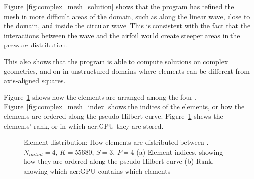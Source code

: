 Figure~\ref{fig:complex_mesh_solution} shows that the program has refined the mesh in more difficult
areas of the domain, such as along the linear wave, close to the domain, and inside the circular
wave. This is consistent with the fact that the interactions between the wave and the airfoil would
create steeper areas in the pressure distribution.

This also shows that the program is able to compute solutions on complex geometries, and on in
unstructured domains where elements can be different from axis-aligned squares.

Figure~\ref{fig:complex_mesh_elements} shows how the elements are arranged among the four
. Figure~\ref{fig:complex_mesh_index} shows the indices of the elements, or how
the elements are ordered along the pseudo-Hilbert curve. Figure~\ref{fig:complex_mesh_elements}
shows the elements' rank, or in which \acrshort{acr:GPU} they are stored.

\begin{figure}[H]
	\centering
	\hfill
	\caption{Element distribution: How elements are distributed between . \(N_{initial} = 4\), \(K = 55680\), \(S = 3\), \(P = 4\) (a) Element indices, showing how they are ordered along the pseudo-Hilbert curve (b) Rank, showing which \acrshort{acr:GPU} contains which elements}\label{fig:complex_mesh_elements}
\end{figure}

